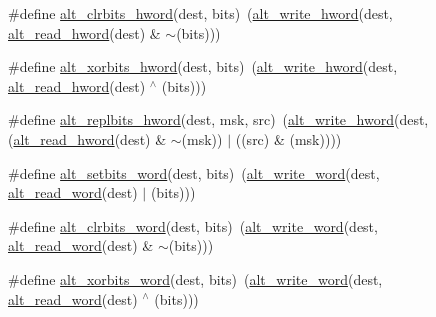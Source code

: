 \begin{DoxyCompactItemize}
\item 
\#define \mbox{\hyperlink{group__ALT__SOCAL__UTIL__SC__FUNC_ga7f52b3995901cf84b0247746f51c3f13}{alt\+\_\+clrbits\+\_\+hword}}(dest,  bits)~(\mbox{\hyperlink{group__ALT__SOCAL__UTIL__RW__FUNC_ga68370263143f2bbcae44530837772f50}{alt\+\_\+write\+\_\+hword}}(dest, \mbox{\hyperlink{group__ALT__SOCAL__UTIL__RW__FUNC_gaae69946769b67a9b8bf4f57143b1c4d7}{alt\+\_\+read\+\_\+hword}}(dest) \& $\sim$(bits)))
\item 
\#define \mbox{\hyperlink{group__ALT__SOCAL__UTIL__SC__FUNC_ga94d39bc81c0cec659847edc490249078}{alt\+\_\+xorbits\+\_\+hword}}(dest,  bits)~(\mbox{\hyperlink{group__ALT__SOCAL__UTIL__RW__FUNC_ga68370263143f2bbcae44530837772f50}{alt\+\_\+write\+\_\+hword}}(dest, \mbox{\hyperlink{group__ALT__SOCAL__UTIL__RW__FUNC_gaae69946769b67a9b8bf4f57143b1c4d7}{alt\+\_\+read\+\_\+hword}}(dest) $^\wedge$ (bits)))
\item 
\#define \mbox{\hyperlink{group__ALT__SOCAL__UTIL__SC__FUNC_gaa4d22a5a4471fa8ae36c532bdbd2ca7f}{alt\+\_\+replbits\+\_\+hword}}(dest,  msk,  src)~(\mbox{\hyperlink{group__ALT__SOCAL__UTIL__RW__FUNC_ga68370263143f2bbcae44530837772f50}{alt\+\_\+write\+\_\+hword}}(dest,(\mbox{\hyperlink{group__ALT__SOCAL__UTIL__RW__FUNC_gaae69946769b67a9b8bf4f57143b1c4d7}{alt\+\_\+read\+\_\+hword}}(dest) \& $\sim$(msk)) $\vert$ ((src) \& (msk))))
\item 
\#define \mbox{\hyperlink{group__ALT__SOCAL__UTIL__SC__FUNC_gaea6f60a4ea5bb48bcbbd8fc33a69881a}{alt\+\_\+setbits\+\_\+word}}(dest,  bits)~(\mbox{\hyperlink{group__ALT__SOCAL__UTIL__RW__FUNC_gac135ea12921af3aeb033c92ddb82c66c}{alt\+\_\+write\+\_\+word}}(dest, \mbox{\hyperlink{group__ALT__SOCAL__UTIL__RW__FUNC_ga77db76edef8b90adb75eb837325b5d11}{alt\+\_\+read\+\_\+word}}(dest) $\vert$ (bits)))
\item 
\#define \mbox{\hyperlink{group__ALT__SOCAL__UTIL__SC__FUNC_ga41dfcdb447a751fa7fe3ba0fc91d7e93}{alt\+\_\+clrbits\+\_\+word}}(dest,  bits)~(\mbox{\hyperlink{group__ALT__SOCAL__UTIL__RW__FUNC_gac135ea12921af3aeb033c92ddb82c66c}{alt\+\_\+write\+\_\+word}}(dest, \mbox{\hyperlink{group__ALT__SOCAL__UTIL__RW__FUNC_ga77db76edef8b90adb75eb837325b5d11}{alt\+\_\+read\+\_\+word}}(dest) \& $\sim$(bits)))
\item 
\#define \mbox{\hyperlink{group__ALT__SOCAL__UTIL__SC__FUNC_gad4a68f8f3703e2650e68d3ff4e00ccd9}{alt\+\_\+xorbits\+\_\+word}}(dest,  bits)~(\mbox{\hyperlink{group__ALT__SOCAL__UTIL__RW__FUNC_gac135ea12921af3aeb033c92ddb82c66c}{alt\+\_\+write\+\_\+word}}(dest, \mbox{\hyperlink{group__ALT__SOCAL__UTIL__RW__FUNC_ga77db76edef8b90adb75eb837325b5d11}{alt\+\_\+read\+\_\+word}}(dest) $^\wedge$ (bits)))

\end{DoxyCompactItemize}
